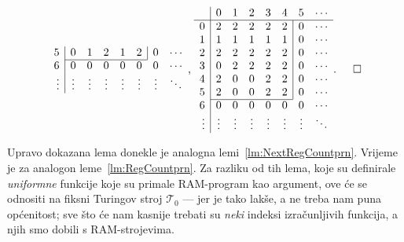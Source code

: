 \begin{primjer}[{name=[kodirana tablica prijelaza]}]
\begin{equation*}
\begin{array}{r|ccccccc}
5& 0 & 1 & 2 & 1 & 2 & \multicolumn{1}{|c}{0} & \cdots\\ \cline{2-6}
6& 0 & 0 & 0 & 0 & 0 & 0 & \cdots\\
\vdots&\vdots&\vdots&\vdots&\vdots&\vdots&\vdots&\ddots
\end{array}\text,\;
\begin{array}{r|ccccccc}
    &0&1&2&3&4&5&\cdots\\\hline
0& 2 & 2 & 2 & 2 & 2 & \multicolumn{1}{|c}{0} & \cdots\\
1& 1 & 1 & 1 & 1 & 1 & \multicolumn{1}{|c}{0} & \cdots\\
2& 2 & 2 & 2 & 2 & 2 & \multicolumn{1}{|c}{0} & \cdots\\
3& 0 & 2 & 2 & 2 & 2 & \multicolumn{1}{|c}{0} & \cdots\\
4& 2 & 0 & 0 & 2 & 2 & \multicolumn{1}{|c}{0} & \cdots\\
5& 2 & 0 & 0 & 2 & 2 & \multicolumn{1}{|c}{0} & \cdots\\ \cline{2-6}
6& 0 & 0 & 0 & 0 & 0 & 0 & \cdots\\
\vdots&\vdots&\vdots&\vdots&\vdots&\vdots&\vdots&\ddots
\end{array}\text.\!\!\!\qedhere
\end{equation*}
\end{primjer}


Upravo dokazana lema donekle je analogna lemi~\ref{lm:NextRegCountprn}. Vrijeme je za analogon leme~\ref{lm:RegCountprn}. Za razliku od tih lema, koje su definirale \emph{uniformne} funkcije koje su primale RAM-program kao argument, ove će se odnositi na fiksni Turingov stroj $\mathcal T_0$ --- jer je tako lakše, a ne treba nam puna općenitost; sve što će nam kasnije trebati su \emph{neki} indeksi izračunljivih funkcija, a njih smo dobili s RAM-strojevima.

